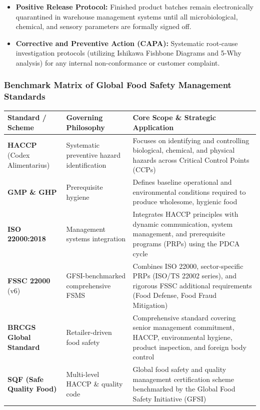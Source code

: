 \documentclass[11pt,a4paper,oneside]{article}
\begin{document}
\begin{enumerate}[leftmargin=*]
\begin{itemize}
        \item \textbf{Positive Release Protocol:} Finished product batches remain electronically quarantined in warehouse management systems until all microbiological, chemical, and sensory parameters are formally signed off.
        \item \textbf{Corrective and Preventive Action (CAPA):} Systematic root-cause investigation protocols (utilizing Ishikawa Fishbone Diagrams and 5-Why analysis) for any internal non-conformance or customer complaint.
    \end{itemize}
\end{enumerate}

\subsubsection{Benchmark Matrix of Global Food Safety Management Standards}

\begin{center}
\begin{tabular}{@{}p{3.2cm} p{4.6cm} p{8.0cm}@{}}
\toprule
\textbf{Standard / Scheme} & \textbf{Governing Philosophy} & \textbf{Core Scope \& Strategic Application} \tabularnewline
\midrule
\textbf{HACCP} (Codex Alimentarius) & Systematic preventive hazard identification & Focuses on identifying and controlling biological, chemical, and physical hazards across Critical Control Points (CCPs) \tabularnewline
\textbf{GMP \& GHP} & Prerequisite hygiene & Defines baseline operational and environmental conditions required to produce wholesome, hygienic food \tabularnewline
\textbf{ISO 22000:2018} & Management systems integration & Integrates HACCP principles with dynamic communication, system management, and prerequisite programs (PRPs) using the PDCA cycle \tabularnewline
\textbf{FSSC 22000} (v6) & GFSI-benchmarked comprehensive FSMS & Combines ISO 22000, sector-specific PRPs (ISO/TS 22002 series), and rigorous FSSC additional requirements (Food Defense, Food Fraud Mitigation) \tabularnewline
\textbf{BRCGS Global Standard} & Retailer-driven food safety & Comprehensive standard covering senior management commitment, HACCP, environmental hygiene, product inspection, and foreign body control \tabularnewline
\textbf{SQF (Safe Quality Food)} & Multi-level HACCP \& quality code & Global food safety and quality management certification scheme benchmarked by the Global Food Safety Initiative (GFSI) \tabularnewline
\bottomrule
\end{tabular}
\end{center}
\end{document}

